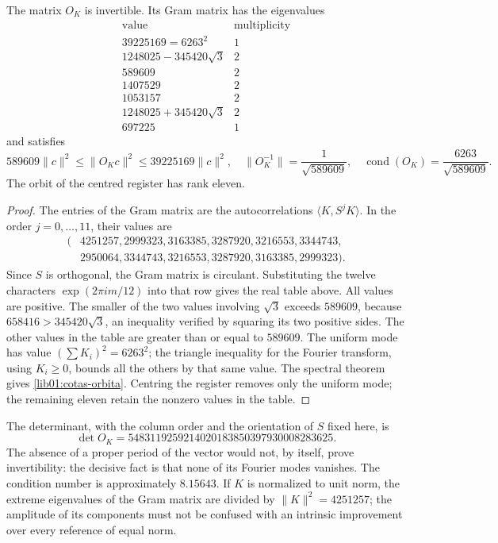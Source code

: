 \begin{theorem}
\label{lib01:marco-ciclico}
The matrix \(O_K\) is invertible. Its Gram matrix has the eigenvalues
\[
\begin{array}{c|c}
 \text{value}&\text{multiplicity}\\\hline
 39225169=6263^2&1\\
 1248025-345420\sqrt3&2\\
 589609&2\\
 1407529&2\\
 1053157&2\\
 1248025+345420\sqrt3&2\\
 697225&1
\end{array}
\]
and satisfies
\begin{equation}
 589609\|c\|^2\leq\|O_Kc\|^2\leq39225169\|c\|^2,
 \quad
 \|O_K^{-1}\|=\frac1{\sqrt{589609}},\quad
 \operatorname{cond}(O_K)=\frac{6263}{\sqrt{589609}}.
 \label{lib01:cotas-orbita}
\end{equation}
The orbit of the centred register has rank eleven.
\end{theorem}
\begin{proof}
The entries of the Gram matrix are the autocorrelations \(\langle K,S^jK\rangle\). In the order \(j=0,\ldots,11\), their values are
\begin{align*}
 (&4251257,2999323,3163385,3287920,3216553,3344743,\\
  &2950064,3344743,3216553,3287920,3163385,2999323).
\end{align*}
Since \(S\) is orthogonal, the Gram matrix is circulant. Substituting the twelve characters \(\exp(2\pi i m/12)\) into that row gives the real table above. All values are positive. The smaller of the two values involving \(\sqrt3\) exceeds \(589609\), because \(658416>345420\sqrt3\), an inequality verified by squaring its two positive sides. The other values in the table are greater than or equal to \(589609\). The uniform mode has value \((\sum K_i)^2=6263^2\); the triangle inequality for the Fourier transform, using \(K_i\geq0\), bounds all the others by that same value. The spectral theorem gives \eqref{lib01:cotas-orbita}. Centring the register removes only the uniform mode; the remaining eleven retain the nonzero values in the table.
\end{proof}

The determinant, with the column order and the orientation of \(S\) fixed here, is
\[
 \det O_K=5483119259214020183850397930008283625.
\]
The absence of a proper period of the vector would not, by itself, prove invertibility: the decisive fact is that none of its Fourier modes vanishes. The condition number is approximately \(8.15643\). If \(K\) is normalized to unit norm, the extreme eigenvalues of the Gram matrix are divided by \(\|K\|^2=4251257\); the amplitude of its components must not be confused with an intrinsic improvement over every reference of equal norm.

